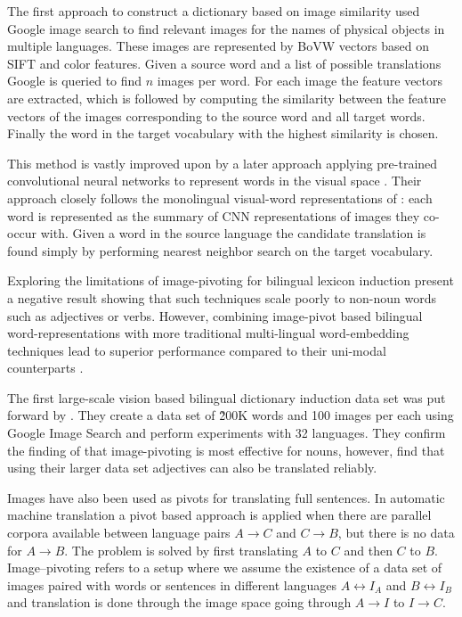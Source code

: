The first approach to construct a dictionary based on image similarity \cite{bergsma2011learning} 
used Google image search to find
relevant images for the names of physical objects in multiple languages.
These images are represented by BoVW vectors based
on SIFT and color features. Given a source word and a list of possible translations
Google is queried to find $n$ images per word. For each image the
feature vectors are extracted, which is followed by computing the similarity
between the feature vectors of the images corresponding to the source word and
all target words. Finally the word in the target vocabulary with the highest
similarity is chosen.

This method is vastly improved upon by a later approach applying
pre-trained convolutional neural networks to represent words
in the visual space \citep{kiela2015visual}. Their approach closely follows
the monolingual visual-word representations of \cite{kiela2014improving}:
each word is represented as the summary of CNN representations of images they
co-occur with. Given a word in the source language the candidate translation is found
simply by performing nearest neighbor search on the target vocabulary.

Exploring the limitations of image-pivoting for bilingual lexicon induction
\cite{hartmann2017limitations} present a negative result
showing that such techniques scale poorly to non-noun words such as
adjectives or verbs. However, combining image-pivot based bilingual
word-representations with more traditional multi-lingual word-embedding
techniques lead to superior performance compared to their uni-modal
counterparts \cite{vulic2016multi}.

The first large-scale vision based bilingual dictionary induction data set
was put forward by \citep{hewitt2018learning}. They create a data set
of \~200K words and 100 images per each using Google Image Search and perform
experiments with 32 languages.
They confirm the finding of \cite{hartmann2017limitations} that image-pivoting
is most effective for nouns, however, find that using their larger data set
adjectives can also be translated reliably. 


Images have also been used as pivots for translating full sentences.
In automatic machine translation a pivot based approach is applied
when there are parallel corpora available between language pairs $A\rightarrow C$
and $C \rightarrow B$, but there is no data for $A\rightarrow B$. The problem is
solved by first translating $A$ to $C$ and then $C$ to $B$.
Image--pivoting refers to a setup where we assume the existence of a data set
of images paired with words or sentences in different languages $A \leftrightarrow I_A$ and
$B \leftrightarrow I_B$ and translation is done through the image space
going  through $A \rightarrow I$ to $I \rightarrow C$.

